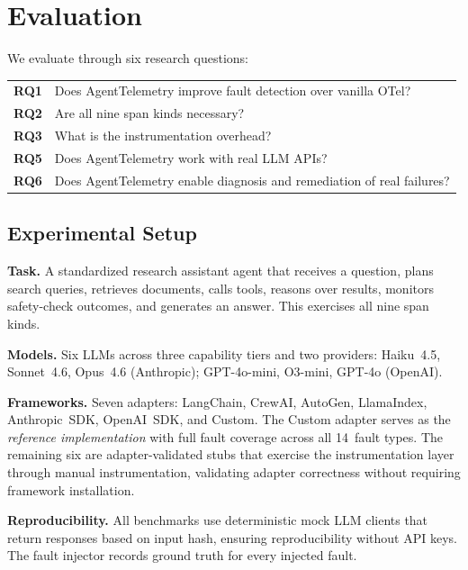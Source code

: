 \documentclass{article}
\begin{document}
\section{Evaluation}
\label{sec:evaluation}

We evaluate through six research questions:

\noindent
\begin{tabular}{@{}lp{5.8cm}@{}}
\textbf{RQ1} & Does AgentTelemetry improve fault detection over vanilla OTel? \\
\textbf{RQ2} & Are all nine span kinds necessary? \\
\textbf{RQ3} & What is the instrumentation overhead? \\
\textbf{RQ5} & Does AgentTelemetry work with real LLM APIs? \\
\textbf{RQ6} & Does AgentTelemetry enable diagnosis and remediation of real failures? \\
\end{tabular}

\subsection{Experimental Setup}

\textbf{Task.}  A standardized research assistant agent that receives a
question, plans search queries, retrieves documents, calls tools,
reasons over results, monitors safety-check outcomes, and generates an
answer.  This exercises all nine span kinds.

\textbf{Models.}  Six LLMs across three capability tiers and two
providers: Haiku~4.5, Sonnet~4.6, Opus~4.6 (Anthropic); GPT-4o-mini,
O3-mini, GPT-4o (OpenAI).

\textbf{Frameworks.}  Seven adapters: LangChain, CrewAI, AutoGen,
LlamaIndex, Anthropic~SDK, OpenAI~SDK, and Custom.  The Custom adapter
serves as the \emph{reference implementation} with full fault coverage
across all 14~fault types.  The remaining six are adapter-validated
stubs that exercise the instrumentation layer through manual
instrumentation, validating adapter correctness without requiring
framework installation.

\textbf{Reproducibility.}  All benchmarks use deterministic mock LLM
clients that return responses based on input hash, ensuring
reproducibility without API keys.  The fault injector records ground
truth for every injected fault.
\end{document}
